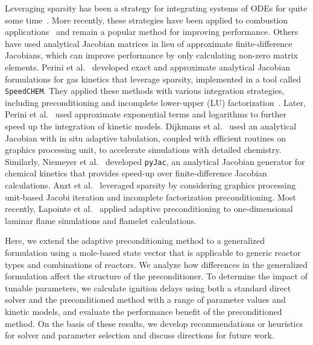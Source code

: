 \documentclass[twocolumn,10pt]{article}
\begin{document}
Leveraging sparsity has been a strategy for integrating systems of ODEs for quite some time~\cite{brown_reduced_1989, saad_ilut_1994}.
More recently, these strategies have been applied to combustion applications~\cite{marzouk_embedding_2012} and remain a popular method for improving performance.
Others have used analytical Jacobian matrices in lieu of approximate finite-difference Jacobians, which can improve performance by only calculating non-zero matrix elements.
Perini et al.~\cite{perini_analytical_2012} developed exact and approximate analytical Jacobian formulations for gas kinetics that leverage sparsity, implemented in a tool called \texttt{SpeedCHEM}.
They applied these methods with various integration strategies, including preconditioning and incomplete lower-upper (LU) factorization~\cite{perini_study_2014}.
Later, Perini et al.~\cite{perini_fast_2018} used approximate exponential terms and logarithms to further speed up the integration of kinetic models.
Dijkmans et al.~\cite{dijkmans_gpu_2014} used an analytical Jacobian with in situ adaptive tabulation, coupled with efficient routines on graphics processing unit, to accelerate simulations with detailed chemistry.
Similarly, Niemeyer et al.~\cite{niemeyer_pyjac_2017} developed \texttt{pyJac}, an analytical Jacobian generator for chemical kinetics that provides speed-up over finite-difference Jacobian calculations.
Anzt et al.~\cite{anzt_preconditioned_2017} leveraged sparsity by considering graphics processing unit-based Jacobi iteration and incomplete factorization preconditioning.
Most recently, Lapointe et al.~\cite{lapointe_sparse_2019, lapointe_computationally-efficient_2020} applied adaptive preconditioning to one-dimensional laminar flame simulations and flamelet calculations.

Here, we extend the adaptive preconditioning method to a generalized formulation using a mole-based state vector that is applicable to generic reactor types and combinations of reactors.
We analyze how differences in the generalized formulation affect the structure of the preconditioner.
To determine the impact of tunable parameters, we calculate ignition delays using both a standard direct solver and the preconditioned method with a range of parameter values and kinetic models, and evaluate the performance benefit of the preconditioned method.
On the basis of these results, we develop recommendations or heuristics for solver and parameter selection and discuss directions for future work.
\end{document}
